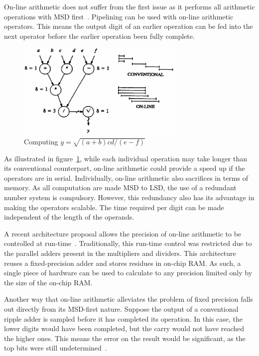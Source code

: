 On-line arithmetic does not suffer from the first issue as it performs all
arithmetic operations with MSD first~\cite{Ercegovac1}.
Pipelining can be used with on-line arithmetic operators.
This means the output digit of an earlier operation can be fed into the next
operator before the earlier operation been fully complete.

\begin{figure}[H]
  \centering
  \includegraphics[width=8cm]{img/Online}
  \caption{Computing $y=\sqrt{(a+b)cd/(e-f)}$~\cite{Ercegovac1}}
  \label{Online}
\end{figure}

As illustrated in figure~\ref{Online}, while each individual operation may
take longer than its conventional counterpart, on-line arithmetic could provide
a speed up if the operators are in serial.
Individually, on-line arithmetic also sacrifices in terms of memory.
As all computation are made MSD to LSD, the use of a redundant number system
is compulsory.
However, this redundancy also has its advantage in making the operators
scalable.
The time required per digit can be made independent of the length of the
operands.~\cite{Trivedi1}

A recent architecture proposal allows the precision of
on-line arithmetic to be controlled at run-time~\cite{Zhao1}.
Traditionally, this run-time control was restricted due to the parallel adders
present in the multipliers and dividers.
This architecture reuses a fixed-precision adder and stores residues in
on-chip RAM.
As such, a single piece of hardware can be used to calculate to any precision
limited only by the size of the on-chip RAM.

Another way that on-line arithmetic alleviates the problem of fixed precision
falls out directly from its MSD-first nature.
Suppose the output of a conventional ripple adder is sampled before
it has completed its operation.
In this case, the lower digits would have been completed, but the carry would
not have reached the higher ones.
This means the error on the result would be significant, as the top bits
were still undetermined~\cite{Shi1}.

